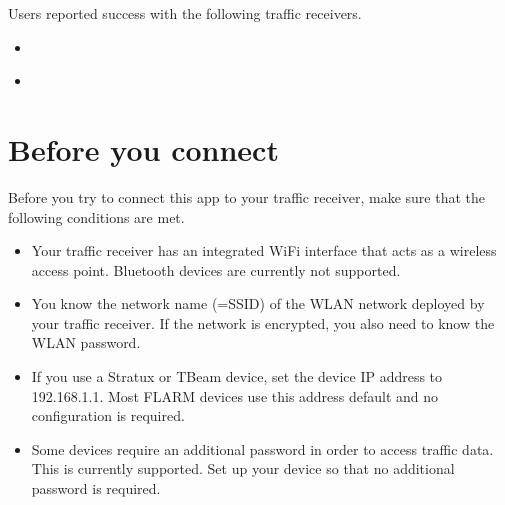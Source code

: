 \documentclass[letterpaper,10pt,english]{sphinxmanual}
\begin{document}
\sphinxAtStartPar
Users reported success with the following traffic receivers.
\begin{itemize}
\item {} 
\sphinxAtStartPar
{}%
\begin{footnote}[11]\sphinxAtStartFootnote
{}
%
\end{footnote}

\item {} 
\sphinxAtStartPar
{}%
\begin{footnote}[12]\sphinxAtStartFootnote
{}
%
\end{footnote}

\end{itemize}


\section{Before you connect}
\label{\detokenize{02-steps/traffic:before-you-connect}}
\sphinxAtStartPar
Before you try to connect this app to your traffic receiver, make sure that the
following conditions are met.
\begin{itemize}
\item {} 
\sphinxAtStartPar
Your traffic receiver has an integrated Wi\sphinxhyphen{}Fi interface that acts as a
wireless access point. Bluetooth devices are currently not supported.

\item {} 
\sphinxAtStartPar
You know the network name (=SSID) of the WLAN network deployed by your traffic
receiver. If the network is encrypted, you also need to know the WLAN
password.

\item {} 
\sphinxAtStartPar
If you use a Stratux or T\sphinxhyphen{}Beam device, set the device IP address to
192.168.1.1.  Most FLARM devices use this address default and  no
configuration is required.

\item {} 
\sphinxAtStartPar
Some devices require an additional password in order to access traffic
data. This is currently  supported. Set up your device so that no
additional password is required.

\end{itemize}
\end{document}
